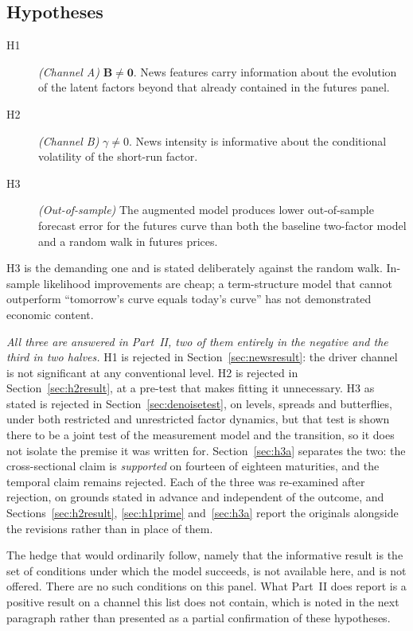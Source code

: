 \documentclass[journal]{IEEEtran}
\begin{document}
\subsection{Hypotheses}

\begin{description}
  \item[H1] \textit{(Channel A)} $\bm{B} \neq \bm{0}$. News features carry information about the evolution of the latent factors beyond that already contained in the futures panel.
  \item[H2] \textit{(Channel B)} $\gamma \neq 0$. News intensity is informative about the conditional volatility of the short-run factor.
  \item[H3] \textit{(Out-of-sample)} The augmented model produces lower out-of-sample forecast error for the futures curve than both the baseline two-factor model and a random walk in futures prices.
\end{description}

H3 is the demanding one and is stated deliberately against the random walk. In-sample likelihood improvements are cheap; a term-structure model that cannot outperform ``tomorrow's curve equals today's curve'' has not demonstrated economic content.

\emph{All three are answered in Part~II, two of them entirely in the negative and the third in two halves.} H1 is rejected in Section~\ref{sec:newsresult}: the driver channel is not significant at any conventional level. H2 is rejected in Section~\ref{sec:h2result}, at a pre-test that makes fitting it unnecessary. H3 as stated is rejected in Section~\ref{sec:denoisetest}, on levels, spreads and butterflies, under both restricted and unrestricted factor dynamics, but that test is shown there to be a joint test of the measurement model and the transition, so it does not isolate the premise it was written for. Section~\ref{sec:h3a} separates the two: the cross-sectional claim is \emph{supported} on fourteen of eighteen maturities, and the temporal claim remains rejected. Each of the three was re-examined after rejection, on grounds stated in advance and independent of the outcome, and Sections~\ref{sec:h2result}, \ref{sec:h1prime} and~\ref{sec:h3a} report the originals alongside the revisions rather than in place of them.

The hedge that would ordinarily follow, namely that the informative result is the set of conditions under which the model succeeds, is not available here, and is not offered. There are no such conditions on this panel. What Part~II does report is a positive result on a channel this list does not contain, which is noted in the next paragraph rather than presented as a partial confirmation of these hypotheses.
\end{document}
